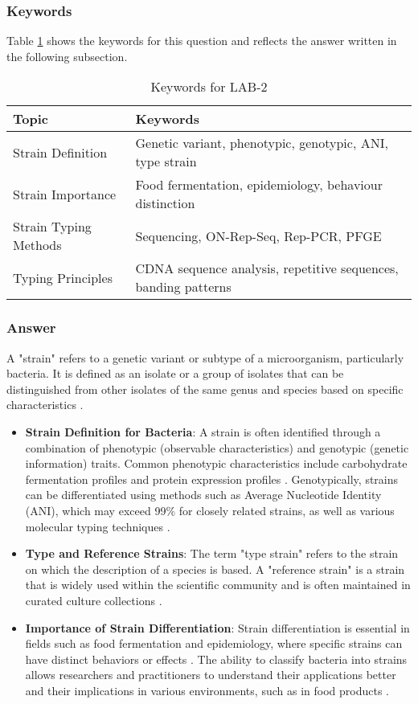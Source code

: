 \subsubsection*{Keywords}
Table \ref{tab:KW-LAB2} shows the keywords for this question and reflects the answer written in the following subsection.
\begin{table}[h]
    \centering
    \caption{Keywords for LAB-2} 
    \label{tab:KW-LAB2}
    \begin{tabular}{l|l}
        \textbf{Topic} & \textbf{Keywords} \\
        \hline
        Strain Definition & Genetic variant, phenotypic, genotypic, ANI, type strain \\
        Strain Importance & Food fermentation, epidemiology, behaviour distinction \\
        Strain Typing Methods & Sequencing, ON-Rep-Seq, Rep-PCR, PFGE \\
        Typing Principles & CDNA sequence analysis, repetitive sequences, banding patterns \\
    \end{tabular}
\end{table}

\subsubsection*{Answer}
A "strain" refers to a genetic variant or subtype of a microorganism, particularly bacteria. It is defined as an isolate or a group of isolates that can be distinguished from other isolates of the same genus and species based on specific characteristics \cite*{LS08}.
\begin{itemize}
    \item \textbf{Strain Definition for Bacteria}:
    \subitem A strain is often identified through a combination of phenotypic (observable characteristics) and genotypic (genetic information) traits. Common phenotypic characteristics include carbohydrate fermentation profiles and protein expression profiles \cite*{LS09}.
    \subitem Genotypically, strains can be differentiated using methods such as Average Nucleotide Identity (ANI), which may exceed 99\% for closely related strains, as well as various molecular typing techniques \cite*{LS09}.
    \item \textbf{Type and Reference Strains}:
    \subitem The term "type strain" refers to the strain on which the description of a species is based. A "reference strain" is a strain that is widely used within the scientific community and is often maintained in curated culture collections \cite*{LS09}.
    \item \textbf{Importance of Strain Differentiation}:
    \subitem Strain differentiation is essential in fields such as food fermentation and epidemiology, where specific strains can have distinct behaviors or effects \cite*{LS09}. 
    \subitem The ability to classify bacteria into strains allows researchers and practitioners to understand their applications better and their implications in various environments, such as in food products \cite{LS09}.
\end{itemize}

